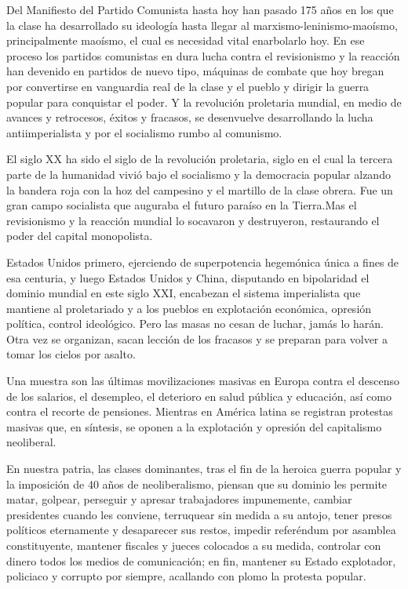 \documentclass[
  a4paper,
]{article}
\begin{document}
Del Manifiesto del Partido Comunista hasta hoy han pasado 175 años en
los que la clase ha desarrollado su ideología hasta llegar al
marxismo-leninismo-maoísmo, principalmente maoísmo, el cual es necesidad
vital enarbolarlo hoy. En ese proceso los partidos comunistas en dura
lucha contra el revisionismo y la reacción han devenido en partidos de
nuevo tipo, máquinas de combate que hoy bregan por convertirse en
vanguardia real de la clase y el pueblo y dirigir la guerra popular para
conquistar el poder. Y la revolución proletaria mundial, en medio de
avances y retrocesos, éxitos y fracasos, se desenvuelve desarrollando la
lucha antiimperialista y por el socialismo rumbo al comunismo.

El siglo XX ha sido el siglo de la revolución proletaria, siglo en el
cual la tercera parte de la humanidad vivió bajo el socialismo y la
democracia popular alzando la bandera roja con la hoz del campesino y el
martillo de la clase obrera. Fue un gran campo socialista que auguraba
el futuro paraíso en la Tierra.Mas el revisionismo y la reacción mundial
lo socavaron y destruyeron, restaurando el poder del capital
monopolista.

Estados Unidos primero, ejerciendo de superpotencia hegemónica única a
fines de esa centuria, y luego Estados Unidos y China, disputando en
bipolaridad el dominio mundial en este siglo XXI, encabezan el sistema
imperialista que mantiene al proletariado y a los pueblos en explotación
económica, opresión política, control ideológico. Pero las masas no
cesan de luchar, jamás lo harán. Otra vez se organizan, sacan lección de
los fracasos y se preparan para volver a tomar los cielos por asalto.

Una muestra son las últimas movilizaciones masivas en Europa contra el
descenso de los salarios, el desempleo, el deterioro en salud pública y
educación, así como contra el recorte de pensiones. Mientras en América
latina se registran protestas masivas que, en síntesis, se oponen a la
explotación y opresión del capitalismo neoliberal.

En nuestra patria, las clases dominantes, tras el fin de la heroica
guerra popular y la imposición de 40 años de neoliberalismo, piensan que
su dominio les permite matar, golpear, perseguir y apresar trabajadores
impunemente, cambiar presidentes cuando les conviene, terruquear sin
medida a su antojo, tener presos políticos eternamente y desaparecer sus
restos, impedir referéndum por asamblea constituyente, mantener fiscales
y jueces colocados a su medida, controlar con dinero todos los medios de
comunicación; en fin, mantener su Estado explotador, policiaco y
corrupto por siempre, acallando con plomo la protesta popular.
\end{document}

